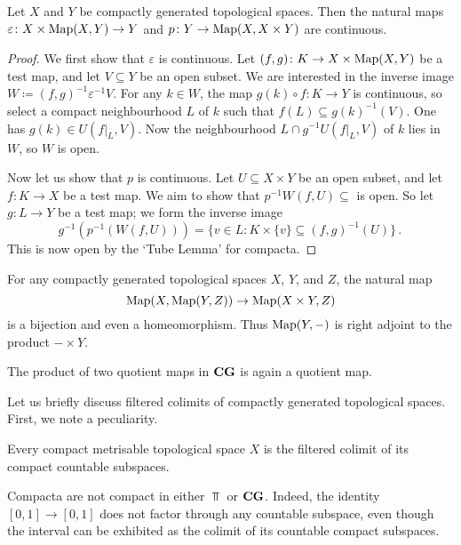 \begin{lem}
	Let $ X $ and $ Y $ be compactly generated topological spaces.
	Then the natural maps $ \varepsilon \colon X \times \operatorname{Map}( X, Y ) \to Y $ and $ p \colon Y \to \operatorname{Map}( X, X \times Y ) $ are continuous.
\end{lem}

\begin{proof}
	We first show that $\varepsilon$ is continuous.
	Let $ ( f, g ) \colon K \to X \times \operatorname{Map}( X, Y ) $ be a test map, and let $ V \subseteq Y $ be an open subset.
	We are interested in the inverse image $ W \coloneq ( f, g )^{-1}\varepsilon^{-1} V $.
	For any $ k \in W $, the map $ g(k) \circ f \colon K \to Y $ is continuous, so select a compact neighbourhood $ L $ of $ k $ such that $ f(L) \subseteq g(k)^{-1}(V) $.
	One has $ g(k) \in U(f|_L, V) $.
	Now the neighbourhood $ L \cap g^{-1}U(f|_L, V) $ of $ k $ lies in $ W $, so $ W $ is open.

	Now let us show that $ p $ is continuous.
	Let $ U \subseteq X \times Y $ be an open subset, and let $ f \colon K \to X $ be a test map.
	We aim to show that $ p^{-1} W(f, U) \subseteq $ is open.
	So let $ g \colon L \to Y $ be a test map;
	we form the inverse image
	\[
		g^{-1}(p^{-1}(W(f, U))) = \{ v \in L : K \times \{v\} \subseteq (f, g)^{-1}(U) \} \period
	\]
	This is now open by the `Tube Lemma' for compacta.
\end{proof}

\begin{cor}
	For any compactly generated topological spaces $ X $, $ Y $, and $ Z $, the natural map
	\[
		\operatorname{Map}( X, \operatorname{Map}(Y, Z) ) \to \operatorname{Map}( X \times Y, Z )
	\]
	is a bijection and even a homeomorphism.
	Thus $ \operatorname{Map}(Y, -) $ is right adjoint to the product $ - \times Y $.
\end{cor}

\begin{cor}
	The product of two quotient maps in $ \textbf{\textup{CG}} $ is again a quotient map.
\end{cor}

Let us briefly discuss filtered colimits of compactly generated topological spaces.
First, we note a peculiarity.

\begin{wrn}
	Every compact metrisable topological space $ X $ is the filtered colimit of its compact countable subspaces.

	Compacta are not compact in either $ \Top $ or $ \textbf{\textup{CG}} $.
	Indeed, the identity $ [0, 1] \to [0, 1] $ does not factor through any countable subspace, even though the interval can be exhibited as the colimit of its countable compact subspaces.
\end{wrn}

